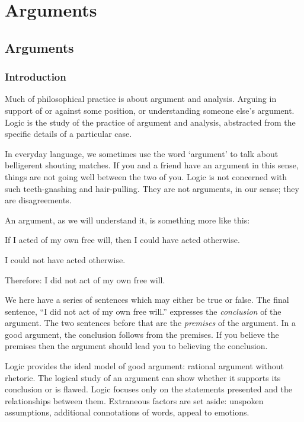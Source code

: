 \part{Arguments}
\label{ch.intro}


\chapter{Arguments}
\label{s:Arguments}
\section{Introduction}
Much of philosophical practice is about argument and
analysis.
Arguing in support of or against some position, or understanding someone else's argument.
Logic is the study of the practice of argument and
analysis, abstracted from the specific details of a
particular case.



In everyday language, we sometimes use the word `argument' to talk about belligerent shouting matches.  If you and a friend have an argument in this sense, things are not going well between the two of you. Logic is not concerned with such teeth-gnashing and hair-pulling. They are not arguments, in our sense; they are disagreements.

An argument, as we will understand it, is something more like this:
		\begin{ebullet}
	\item If I acted of my own free will, then I could have acted otherwise.
	\item I could not have acted otherwise.
	\item Therefore: I did not act of my own free will.
		\end{ebullet}
We here have a series of sentences which may either be true or false. The final sentence, ``I did not act of my own free will.'' expresses the \emph{conclusion} of the argument. The two sentences before that are the \emph{premises} of the argument. In a good argument, the conclusion follows from the premises. If you believe the premises then the argument should lead you to believing the conclusion.

Logic provides the ideal model of good argument:
rational argument without rhetoric.
The logical study of an argument can show whether it
supports its conclusion or is flawed.
Logic focuses only on the statements presented and the
relationships between them.
Extraneous factors are set aside: unspoken assumptions,
additional connotations of words, appeal to emotions.

